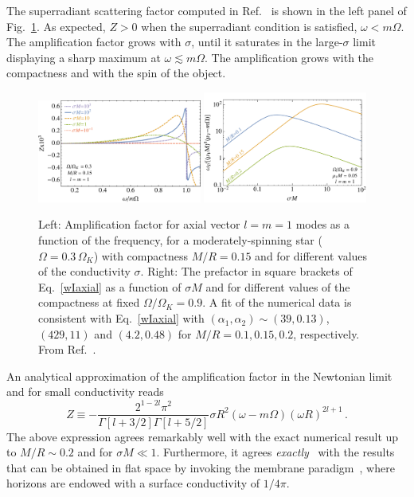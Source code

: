 \documentclass[11pt]{article}
\newcommand{\be}{\begin{equation}}
\newcommand{\ee}{\end{equation}}
\numberwithin{equation}{section} %
\begin{document}
The superradiant scattering factor computed in Ref.~\cite{Cardoso:2017kgn} is shown in the left 
panel of Fig.~\ref{fig:SRstar}. As expected, $Z>0$ when the superradiant condition is satisfied, $\omega<m\Omega$. The 
amplification factor grows with $\sigma$, until it saturates in the large-$\sigma$ limit displaying a sharp maximum at 
$\omega\lesssim m\Omega$. The amplification grows with the compactness and with the spin of the object.
%
\begin{figure}[th]
  \includegraphics[width=0.48\textwidth]{scattering_axial_v2.pdf}
  \includegraphics[width=0.48\textwidth]{instability_axial_v2.pdf}
\caption{Left: Amplification factor for axial vector $l=m=1$ modes as a function of the frequency, for 
a moderately-spinning star ($\Omega=0.3\,\Omega_K$) with compactness $M/R=0.15$ and for different values of the 
conductivity $\sigma$.
%
Right: The prefactor in square brackets of Eq.~\eqref{wIaxial} as a function of $\sigma M$ and for different values of 
the compactness at fixed $\Omega/\Omega_K=0.9$. A fit of the numerical data is consistent with Eq.~\eqref{wIaxial} with 
$(\alpha_1,\alpha_2)\sim(39,0.13)$, $(429,11)$ and $(4.2,0.48)$ for $M/R=0.1,0.15,0.2$, respectively.
From Ref.~\cite{Cardoso:2017kgn}.
} \label{fig:SRstar}
\end{figure}
%

An analytical approximation of the amplification factor in the Newtonian limit and for small 
conductivity reads~\cite{Cardoso:2017kgn}
%
\be
Z\equiv -\frac{2^{1-2l}\pi^2}{\Gamma[l+3/2]\Gamma[l+5/2]}\sigma R^2\left(\omega -m\Omega\right)(\omega 
R)^{2l+1}\,.
\ee
%
%
The above expression agrees remarkably well with the exact numerical result up to $M/R\sim 0.2$ and for $\sigma M\ll1$.
%
Furthermore, it agrees {\it exactly}~\cite{Cardoso:2017kgn} with the results that can be obtained in flat space by 
invoking the membrane paradigm~\cite{MembraneParadigm}, where horizons are endowed with a surface conductivity of 
$1/4\pi$.
\end{document}

